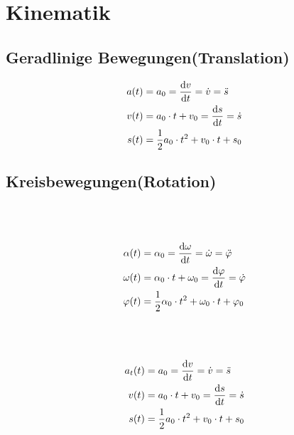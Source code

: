 \section{Kinematik}
\subsection{Geradlinige Bewegungen(Translation)}

\begin{shaded}
\begin{align*}
	a(t)&=a_0=\frac{\mathop{}\!\mathrm{d} v}{\mathop{}\!\mathrm{d} t}=\dot{v}=\ddot{s} \\
	v(t)&=a_0\cdot t+v_0=\frac{\mathop{}\!\mathrm{d} s}{\mathop{}\!\mathrm{d} t}=\dot{s} \\
	s(t)&=\frac{1}{2}a_0\cdot t^2+v_0\cdot t+s_0
\end{align*}
\end{shaded}

\subsection{Kreisbewegungen(Rotation)}

\begin{boxleft}
\\
\\
\end{boxleft}\begin{boxrightshaded}
\begin{align*}
\alpha(t)&=\alpha_0=\frac{\mathop{}\!\mathrm{d} \omega}{\mathop{}\!\mathrm{d} t}=\dot{\omega}=\ddot{\varphi} \\
\omega(t)&=\alpha_0\cdot t+\omega_0=\frac{\mathop{}\!\mathrm{d} \varphi}{\mathop{}\!\mathrm{d} t}=\dot{\varphi} \\
\varphi(t)&=\frac{1}{2}\alpha_0\cdot t^2+\omega_0\cdot t+\varphi_0
\end{align*}
\end{boxrightshaded}

\begin{boxleft}
\\
\\
\end{boxleft}\begin{boxrightshaded}
\begin{align*}
a_t(t)&=a_0=\frac{\mathop{}\!\mathrm{d} v}{\mathop{}\!\mathrm{d} t}=\dot{v}=\ddot{s} \\
v(t)&=a_0\cdot t+v_0=\frac{\mathop{}\!\mathrm{d} s}{\mathop{}\!\mathrm{d} t}=\dot{s} \\
s(t)&=\frac{1}{2}a_0\cdot t^2+v_0\cdot t+s_0
\end{align*}
\end{boxrightshaded}

